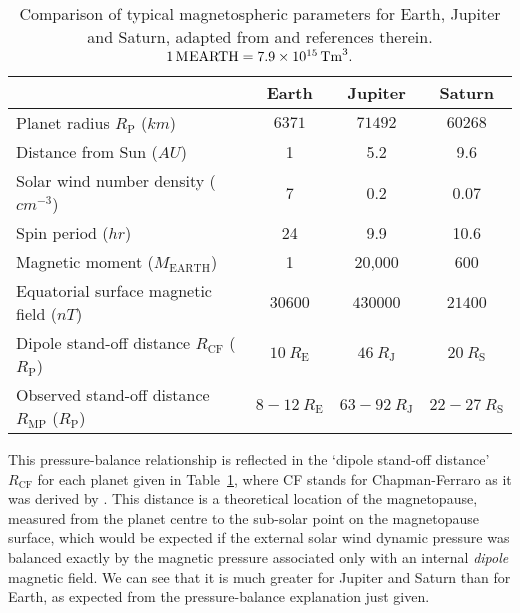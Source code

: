 \begin{table}
\caption[Comparison of typical magnetospheric parameters for Earth, Jupiter and Saturn.]{Comparison of typical magnetospheric parameters for Earth, Jupiter and Saturn, adapted from \citet{bagenal2014} and references therein.$\SI{1}{M_\mathrm{EARTH}} = \SI{7.9D15}{\tesla \m^3}.$}\label{intro:table:magnetospherecomparison}
\centering
\begin{tabular}{l c c c}
\hline
 																															& Earth						& Jupiter			& Saturn  \\
\hline
Planet radius $R_\mathrm{P}$ ($\si{km}$)															& $\num{6371}$					&	$\num{71492}$			&	$\num{60268}$ \\
Distance from Sun ($\si{AU}$)																			&	1							&	5.2				& 9.6		\\
Solar wind number density ($\si{cm^{-3}}$)														& 7							&	0.2				&	0.07		\\
Spin period ($\si{hr}$)																						&	24						& 	9.9				&10.6		\\
Magnetic moment ($\si{M_\mathrm{EARTH}}$)													&	1							&	20,000			&	600		\\
Equatorial surface magnetic field ($\si{nT}$)														&	$\num{30600}$					&	$\num{430000}$		&	$\num{21400}	$\\
Dipole stand-off distance $R_\mathrm{CF}$	($\si{R_\mathrm{P}}$) 				&	$\SI{10}{R_\mathrm{E}}$ & $\SI{46}{R_\mathrm{J}}$ & $\SI{20}{R_\mathrm{S}}$ \\
Observed stand-off distance $R_\mathrm{MP}$ ($\si{R_\mathrm{P}}$)			&	$8-\SI{12}{R_\mathrm{E}}$ & $63-\SI{92}{R_\mathrm{J}}$ & $22-\SI{27}{R_\mathrm{S}}$ \\
\hline
\end{tabular}
\end{table}

This pressure-balance relationship is reflected in the `dipole stand-off distance' $R_\mathrm{CF}$ for each planet given in Table~\ref{intro:table:magnetospherecomparison}, where CF stands for Chapman-Ferraro as it was derived by \citet{chapman1930}. This distance is a theoretical location of the magnetopause, measured from the planet centre to the sub-solar point on the magnetopause surface, which would be expected if the external solar wind dynamic pressure was balanced exactly by the magnetic pressure associated only with an internal \textit{dipole} magnetic field. We can see that it is much greater for Jupiter and Saturn than for Earth, as expected from the pressure-balance explanation just given.

